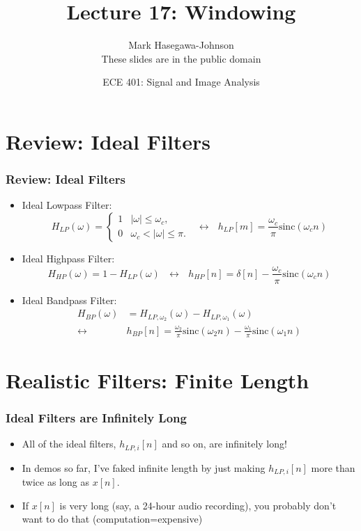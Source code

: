 \documentclass{beamer}
\title{Lecture 17: Windowing}
\author{Mark Hasegawa-Johnson\\These slides are in the public domain}
\date{ECE 401: Signal and Image Analysis}
\begin{document}
\begin{frame}
  \maketitle
\end{frame}

\begin{frame}
  \tableofcontents
\end{frame}

\section[Review]{Review: Ideal Filters}
\setcounter{subsection}{1}

\begin{frame}
  \frametitle{Review: Ideal Filters}
  \begin{itemize}
  \item Ideal Lowpass Filter:
    \[
    H_{LP}(\omega)
    = \begin{cases} 1& |\omega|\le\omega_c,\\
      0 & \omega_c<|\omega|\le\pi.
    \end{cases}~~~\leftrightarrow~~~
    h_{LP}[m]=\frac{\omega_c}{\pi}\mbox{sinc}(\omega_c n)
    \]
  \item Ideal Highpass Filter:
    \[
    H_{HP}(\omega)=1-H_{LP}(\omega)~~~\leftrightarrow~~~
    h_{HP}[n]=\delta[n]-\frac{\omega_c}{\pi}\mbox{sinc}(\omega_c n)
    \]
  \item Ideal Bandpass Filter:
    \begin{align*}
      H_{BP}(\omega)&=H_{LP,\omega_2}(\omega)-H_{LP,\omega_1}(\omega)\\
      \leftrightarrow
      &h_{BP}[n]=\frac{\omega_2}{\pi}\mbox{sinc}(\omega_2 n)-\frac{\omega_1}{\pi}\mbox{sinc}(\omega_1 n)
    \end{align*}
  \end{itemize}
\end{frame}


\section[Finite-Length]{Realistic Filters: Finite Length}
\setcounter{subsection}{1}

\begin{frame}
  \frametitle{Ideal Filters are Infinitely Long}
  
  \begin{itemize}
  \item All of the ideal filters, $h_{LP,i}[n]$ and so on, are infinitely
    long!
  \item In demos so far, I've faked infinite length by just making
    $h_{LP,i}[n]$ more than twice as long as $x[n]$.
  \item If $x[n]$ is very long (say, a 24-hour audio recording), you
    probably don't want to do that (computation=expensive)
  \end{itemize}
\end{frame}
\end{document}
